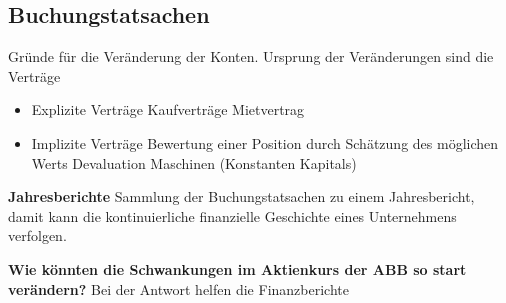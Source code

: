 \subsection{Buchungstatsachen}
\begin{definition}
    [Buchungstatsache] Gründe für die Veränderung der Konten. Ursprung der Veränderungen sind die Verträge
\end{definition}
\begin{itemize}
    \item Explizite Verträge
        \subitem Kaufverträge 
        \subitem Mietvertrag 
    \item Implizite Verträge
        \subitem Bewertung einer Position durch Schätzung des möglichen Werts
        \subitem Devaluation Maschinen (Konstanten Kapitals)
\end{itemize}

\textbf{Jahresberichte}
Sammlung der Buchungstatsachen zu einem Jahresbericht, damit kann die kontinuierliche finanzielle Geschichte eines Unternehmens verfolgen.

\textbf{Wie könnten die Schwankungen im Aktienkurs der ABB so start verändern?} \break
Bei der Antwort helfen die Finanzberichte
